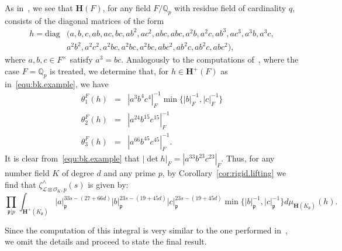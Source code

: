 \documentclass[11pt,a4paper]{amsart}
\theoremstyle{plain}
\theoremstyle{remark}
\newcommand{\Q}{\mathbb{Q}}
\newcommand{\tensor}{\otimes}
\newcommand{\p}{\mathfrak{p}}
\def \p {\ensuremath{\mathfrak{p}}}
\begin{document}
As in~\cite[(5.1)]{BK/15}, we see that $\mathbf{H}(F)$, for any field $F / \Q_p$ with residue field of cardinality $q$, consists of the diagonal matrices of the form
\begin{align} \label{equ:bk.example}
h = \mathrm{diag} & (a,b,c,ab,ac,bc,ab^2, ac^2, abc,abc,a^2 b, a^2 c, ab^3, ac^3, a^3 b, a^3 c, \\ \nonumber
& a^2 b^2, a^2 c^2, a^2 bc, a^2 bc, a^2 bc, abc^2, a b^2 c, ab^2 c, abc^2),
\end{align}
where $a,b,c \in F^\times$ satisfy $a^3 = bc$.  
Analogously to the computations of~\cite[Section 5]{BK/15}, where the case $F = \Q_p$ is treated, we determine that, for $h \in \mathbf{H}^+(F)$ as in~\eqref{equ:bk.example}, we have
\begin{eqnarray*}
\theta_1^F (h) & = &  | a^3 b^4 c^4 |_{F}^{-1} \min \{ |b|_{F}^{-1} , |c|^{-1}_{F} \} \\
\theta_2^F (h) & = &  | a^{24} b^{15} c^{15} |^{-1}_{F} \\
\theta_3^F (h) & = &  | a^{66} b^{45} c^{45} |^{-1}_{F}.
\end{eqnarray*}
It is clear from~\eqref{equ:bk.example} that $|\det h |_{F} = | a^{33} b^{23} c^{23} |_{F}$.  Thus, for any number field $K$ of degree $d$ and any prime $p$, by Corollary~\ref{cor:rigid.lifting} we find that $\zeta^\wedge_{\mathcal{L} \tensor \mathcal{O}_K,p}(s)$ is given by:
$$
\prod_{\p | p} \int_{\mathbf{H}^+(K_\p)} |a|_{\p}^{33s - (27 + 66d)} |b|_{\p}^{23s - (19 + 45d)} |c|_{\p}^{23s - (19 + 45d)} \min \{ |b|_{\p}^{-1}, |c|_{\p}^{-1} \} d \mu_{\mathbf{H}(K_\p)}(h).
$$


Since the computation of this integral is very similar to the one performed in~\cite{BK/15}, we omit the details and proceed to state the final result.
\end{document}
